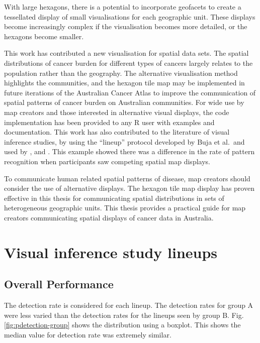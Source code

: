 \documentclass{monashthesis}
\begin{document}
With large hexagons, there is a potential to incorporate geofacets \autocite{IGF} to create a tessellated display of small visualisations for each geographic unit. These displays become increasingly complex if the visualisation becomes more detailed, or the hexagons become smaller.

This work has contributed a new visualisation for spatial data sets. The spatial distributions of cancer burden for different types of cancers largely relates to the population rather than the geography. The alternative visualisation method highlights the communities, and the hexagon tile map may be implemented in future iterations of the Australian Cancer Atlas to improve the communication of spatial patterns of cancer burden on Australian communities. For wide use by map creators and those interested in alternative visual displays, the code implementation has been provided to any R user with examples and documentation.
This work has also contributed to the literature of visual inference studies, by using the ``lineup'' protocol developed by Buja et al.~and used by \textcite{GIIV}, and \textcite{GTPCCD}. This example showed there was a difference in the rate of pattern recognition when participants saw competing spatial map displays.

To communicate human related spatial patterns of disease, map creators should consider the use of alternative displays. The hexagon tile map display has proven effective in this thesis for communicating spatial distributions in sets of heterogeneous geographic units. This thesis provides a practical guide for map creators communicating spatial displays of cancer data in Australia.

\appendix

\hypertarget{visual-inference-study-lineups}{%
\chapter{Visual inference study lineups}\label{visual-inference-study-lineups}}

\hypertarget{overall-performance}{%
\section{Overall Performance}\label{overall-performance}}

The detection rate is considered for each lineup. The detection rates for group A were less varied than the detection rates for the lineups seen by group B. Fig. \ref{fig:pdetection-group} shows the distribution using a boxplot. This shows the median value for detection rate was extremely similar.
\end{document}
